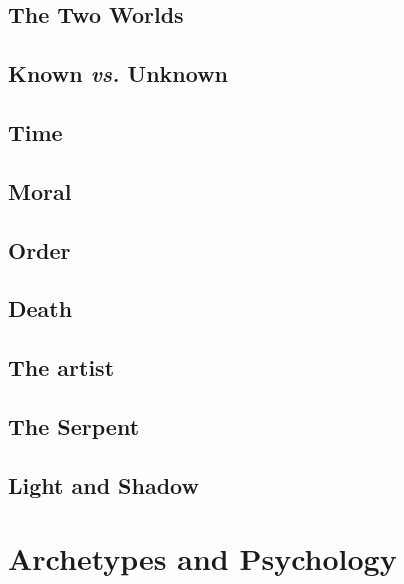 \documentclass[
]{book}
\begin{document}
\hypertarget{the-two-worlds}{%
\section{The Two Worlds}\label{the-two-worlds}}

\hypertarget{known-vs.-unknown}{%
\section{\texorpdfstring{Known \emph{vs.} Unknown}{Known vs. Unknown}}\label{known-vs.-unknown}}

\hypertarget{time}{%
\section{Time}\label{time}}

\hypertarget{moral}{%
\section{Moral}\label{moral}}

\hypertarget{order}{%
\section{Order}\label{order}}

\hypertarget{death}{%
\section{Death}\label{death}}

\hypertarget{the-artist}{%
\section{The artist}\label{the-artist}}

\hypertarget{the-serpent}{%
\section{The Serpent}\label{the-serpent}}

\hypertarget{light-and-shadow}{%
\section{Light and Shadow}\label{light-and-shadow}}

\hypertarget{archetypes-and-psychology}{%
\chapter{Archetypes and Psychology}\label{archetypes-and-psychology}}
\end{document}
